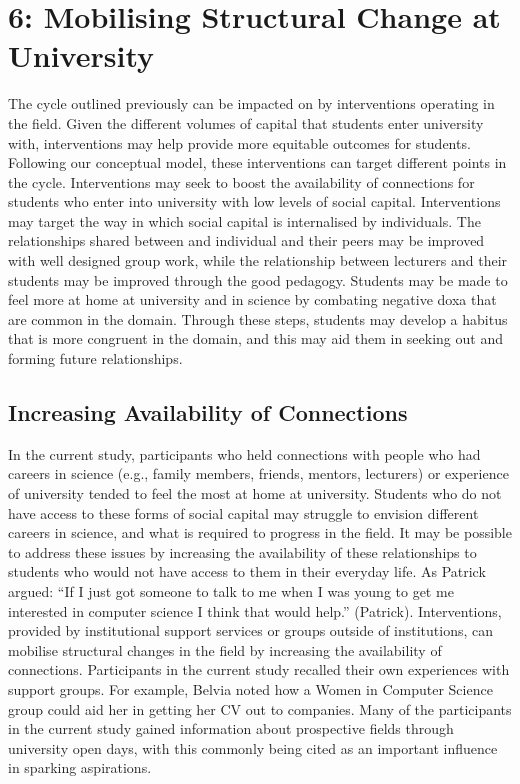 \section{6: Mobilising Structural Change at University}
The cycle outlined previously can be impacted on by interventions operating in the field. Given the different volumes of capital that students enter university with, interventions may help provide more equitable outcomes for students. Following our conceptual model, these interventions can target different points in the cycle. Interventions may seek to boost the availability of connections for students who enter into university with low levels of social capital. Interventions may target the way in which social capital is internalised by individuals. The relationships shared between and individual and their peers may be improved with well designed group work, while the relationship between lecturers and their students may be improved through the good pedagogy. Students may be made to feel more at home at university and in science by combating negative doxa that are common in the domain. Through these steps, students may develop a habitus that is more congruent in the domain, and this may aid them in seeking out and forming future relationships.

\subsection{Increasing Availability of Connections}
In the current study, participants who held connections with people who had careers in science (e.g., family members, friends, mentors, lecturers) or experience of university tended to feel the most at home at university. Students who do not have access to these forms of social capital may struggle to envision different careers in science, and what is required to progress in the field. It may be possible to address these issues by increasing the availability of these relationships to students who would not have access to them in their everyday life. As Patrick argued: ``If I just got someone to talk to me when I was young to get me interested in computer science I think that would help.'' (Patrick). Interventions, provided by institutional support services or groups outside of institutions, can mobilise structural changes in the field by increasing the availability of connections. Participants in the current study recalled their own experiences with support groups. For example, Belvia noted how a Women in Computer Science group could aid her in getting her CV out to companies. Many of the participants in the current study gained information about prospective fields through university open days, with this commonly being cited as an important influence in sparking aspirations. 

